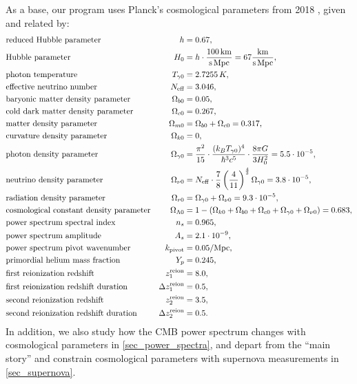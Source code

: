\documentclass[10pt,a4paper]{article}
\begin{document}
As a base, our program uses Planck's cosmological parameters from 2018 \cite{planckcollaborationPlanck2018Results2020},
given and related by:
\begin{equation}
\begin{aligned}
	& \text{reduced Hubble parameter} & h &= 0.67, \\
	& \text{Hubble parameter} & H_0 &= h \cdot \frac{100\,\mathrm{km}}{\mathrm{s}\,\mathrm{Mpc}} = 67 \frac{\mathrm{km}}{\mathrm{s}\,\mathrm{Mpc}}, \\
	& \text{photon temperature} & T_{\gamma0} &= 2.7255\,K, \\
	& \text{effective neutrino number} & N_\text{eff} &= 3.046, \\
	& \text{baryonic matter density parameter} & \Omega_{b0} &= 0.05, \\
	& \text{cold dark matter density parameter} & \Omega_{c0} &= 0.267,\\
	& \text{matter density parameter} & \Omega_{m0} &= \Omega_{b0} + \Omega_{c0} = 0.317, \\
	& \text{curvature density parameter} & \Omega_{k0} &= 0, \\
	& \text{photon density parameter} & \Omega_{\gamma0} &= \frac{\pi^2}{15} \cdot \frac{(k_B T_{\gamma0})^4}{\hbar^3 c^5} \cdot \frac{8 \pi G}{3 H_0^2} = 5.5 \cdot 10^{-5} , \\
	& \text{neutrino density parameter} & \Omega_{\nu0} &= N_{\rm eff}\cdot \frac{7}{8}\left(\frac{4}{11}\right)^{\frac43}\Omega_{\gamma 0} = 3.8 \cdot 10^{-5} , \\
	& \text{radiation density parameter} & \Omega_{r0} &= \Omega_{\gamma0} + \Omega_{\nu0} = 9.3 \cdot 10^{-5}, \\
	& \text{cosmological constant density parameter} & \Omega_{\Lambda 0} &= 1 - (\Omega_{k 0}+\Omega_{b 0}+\Omega_{c0}+\Omega_{\gamma 0}+\Omega_{\nu 0}) = 0.683,\\
	& \text{power spectrum spectral index} & n_s &= 0.965, \\
	& \text{power spectrum amplitude} & A_s &= 2.1\cdot 10^{-9}, \\
	& \text{power spectrum pivot wavenumber} & k_\text{pivot} &= 0.05/\textrm{Mpc}, \\
	& \text{primordial helium mass fraction} & Y_p &= 0.245, \\
	& \text{first reionization redshift} & z^{\rm reion}_1 &= 8.0, \\
	& \text{first reionization redshift duration} & \Delta z^{\rm reion}_1 &= 0.5, \\
	& \text{second reionization redshift} & z^{\rm reion}_2 &= 3.5, \\
	& \text{second reionization redshift duration} & \Delta z^{\rm reion}_2 &= 0.5.
\end{aligned}
\label{eq_planck2018}
\end{equation}
In addition,
we also study how the CMB power spectrum changes with cosmological parameters in \cref{sec_power_spectra}, 
and depart from the ``main story'' and constrain cosmological parameters with supernova measurements in \cref{sec_supernova}.
\end{document}
